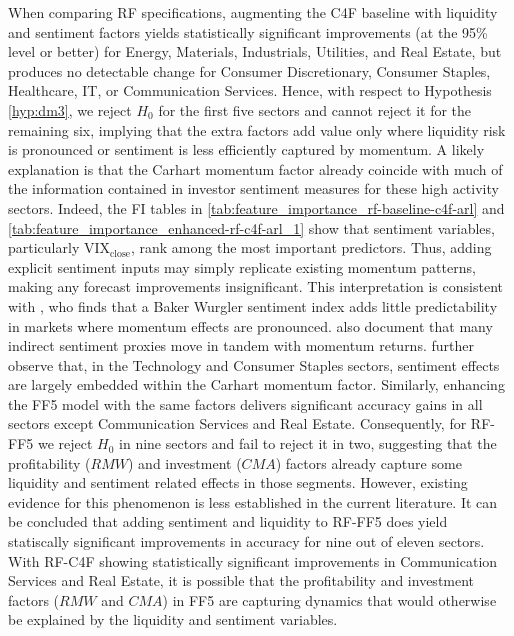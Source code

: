 When comparing RF specifications, augmenting the C4F baseline with liquidity and sentiment factors yields statistically significant improvements (at the 95\% level or better) for Energy, Materials, Industrials, Utilities, and Real Estate, but produces no detectable change for Consumer Discretionary, Consumer Staples, Healthcare, IT, or Communication Services. Hence, with respect to Hypothesis \ref{hyp:dm3}, we reject $H_{0}$ for the first five sectors and cannot reject it for the remaining six, implying that the extra factors add value only where liquidity risk is pronounced or sentiment is less efficiently captured by momentum. A likely explanation is that the Carhart momentum factor already coincide with much of the information contained in investor sentiment measures for these high activity sectors. Indeed, the FI tables in \cref{tab:feature_importance_rf-baseline-c4f-arl} and \cref{tab:feature_importance_enhanced-rf-c4f-arl_1} show that sentiment variables, particularly $\mathrm{VIX}_{\text{close}}$, rank among the most important predictors. Thus, adding explicit sentiment inputs may simply replicate existing momentum patterns, making any forecast improvements insignificant. This interpretation is consistent with , who finds that a Baker Wurgler sentiment index adds little predictability in markets where momentum effects are pronounced.  also document that many indirect sentiment proxies move in tandem with momentum returns.  further observe that, in the Technology and Consumer Staples sectors, sentiment effects are largely embedded within the Carhart momentum factor.  Similarly, enhancing the FF5 model with the same factors delivers significant accuracy gains in all sectors except Communication Services and Real Estate. Consequently, for RF-FF5 we reject $H_{0}$ in nine sectors and fail to reject it in two, suggesting that the profitability ($RMW$) and investment ($CMA$) factors already capture some liquidity and sentiment related effects in those segments. However, existing evidence for this phenomenon is less established in the current literature.  It can be concluded that adding sentiment and liquidity to RF-FF5 does yield statiscally significant improvements in accuracy for nine out of eleven sectors. With RF-C4F showing statistically significant improvements in Communication Services and Real Estate, it is possible that the profitability and investment factors ($RMW$ and $CMA$) in FF5 are capturing dynamics that would otherwise be explained by the liquidity and sentiment variables.

